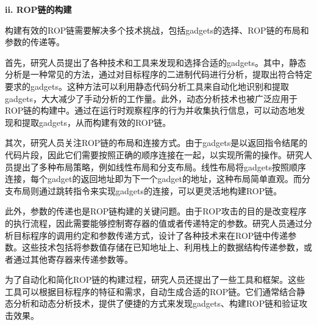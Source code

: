 \documentclass[UTF8,12pt,a4paper]{ctexart}
\numberwithin{figure}{section}
\begin{document}
\textbf{ii. ROP链的构建}
\par 构建有效的ROP链需要解决多个技术挑战，包括gadgets的选择、ROP链的布局和参数的传递等。
\par 首先，研究人员提出了各种技术和工具来发现和选择合适的gadgets。其中，静态分析是一种常见的方法，通过对目标程序的二进制代码进行分析，提取出符合特定要求的gadgets。这种方法可以利用静态代码分析工具来自动化地识别和提取gadgets，大大减少了手动分析的工作量。此外，动态分析技术也被广泛应用于ROP链的构建中。通过在运行时观察程序的行为并收集执行信息，可以动态地发现和提取gadgets，从而构建有效的ROP链。
\par 其次，研究人员关注ROP链的布局和连接方式。由于gadgets是以返回指令结尾的代码片段，因此它们需要按照正确的顺序连接在一起，以实现所需的操作。研究人员提出了多种布局策略，例如线性布局和分支布局。线性布局将gadgets按照顺序连接，每个gadget的返回地址即为下一个gadget的地址，这种布局简单直观。而分支布局则通过跳转指令来实现gadgets的连接，可以更灵活地构建ROP链。
\par 此外，参数的传递也是ROP链构建的关键问题。由于ROP攻击的目的是改变程序的执行流程，因此需要能够控制寄存器的值或者传递特定的参数。研究人员通过分析目标程序的调用约定和参数传递方式，设计了各种技术来在ROP链中传递参数。这些技术包括将参数值存储在已知地址上、利用栈上的数据结构传递参数，或者通过其他寄存器来传递参数等。
\par 为了自动化和简化ROP链的构建过程，研究人员还提出了一些工具和框架。这些工具可以根据目标程序的特征和需求，自动生成合适的ROP链。它们通常结合静态分析和动态分析技术，提供了便捷的方式来发现gadgets、构建ROP链和验证攻击效果。\\
\end{document}
